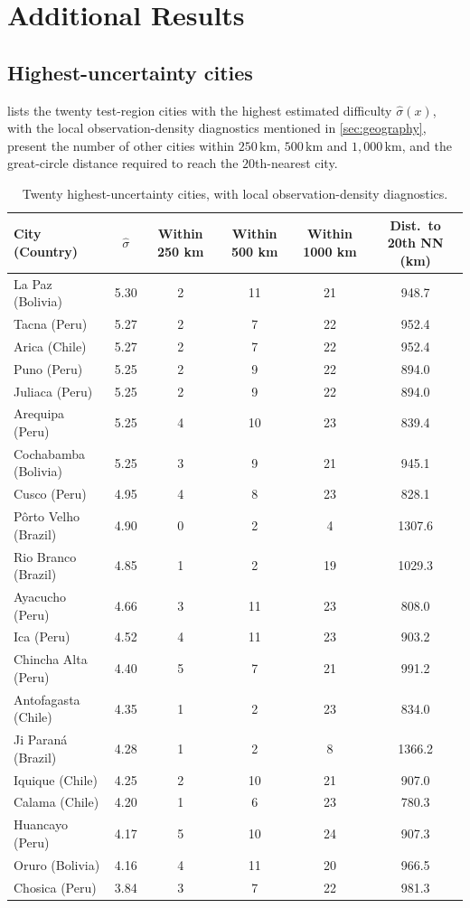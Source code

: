 \chapter{Additional Results}
\label{ch:appendix}

\section{Highest-uncertainty cities}

 lists the twenty test-region cities with the highest estimated difficulty $\hat\sigma(x)$, with the local observation-density diagnostics mentioned in \cref{sec:geography}, present the number of other cities within $250\,\mathrm{km}$, $500\,\mathrm{km}$ and $1{,}000\,\mathrm{km}$, and the great-circle distance required to reach the $20$th-nearest city.
\begin{table}[H]
\centering
\caption{Twenty highest-uncertainty cities, with local observation-density diagnostics.}
\label{tab:appendix-cities}
\scriptsize
\begin{tabular}{lccccc}
\toprule
City (Country) & $\hat\sigma$ & Within 250 km & Within 500 km & Within 1000 km & Dist.\ to 20th NN (km) \\
\midrule
La Paz (Bolivia) & 5.30 & 2 & 11 & 21 & 948.7 \\
Tacna (Peru) & 5.27 & 2 & 7 & 22 & 952.4 \\
Arica (Chile) & 5.27 & 2 & 7 & 22 & 952.4 \\
Puno (Peru) & 5.25 & 2 & 9 & 22 & 894.0 \\
Juliaca (Peru) & 5.25 & 2 & 9 & 22 & 894.0 \\
Arequipa (Peru) & 5.25 & 4 & 10 & 23 & 839.4 \\
Cochabamba (Bolivia) & 5.25 & 3 & 9 & 21 & 945.1 \\
Cusco (Peru) & 4.95 & 4 & 8 & 23 & 828.1 \\
P\^orto Velho (Brazil) & 4.90 & 0 & 2 & 4 & 1307.6 \\
Rio Branco (Brazil) & 4.85 & 1 & 2 & 19 & 1029.3 \\
Ayacucho (Peru) & 4.66 & 3 & 11 & 23 & 808.0 \\
Ica (Peru) & 4.52 & 4 & 11 & 23 & 903.2 \\
Chincha Alta (Peru) & 4.40 & 5 & 7 & 21 & 991.2 \\
Antofagasta (Chile) & 4.35 & 1 & 2 & 23 & 834.0 \\
Ji Paran\'a (Brazil) & 4.28 & 1 & 2 & 8 & 1366.2 \\
Iquique (Chile) & 4.25 & 2 & 10 & 21 & 907.0 \\
Calama (Chile) & 4.20 & 1 & 6 & 23 & 780.3 \\
Huancayo (Peru) & 4.17 & 5 & 10 & 24 & 907.3 \\
Oruro (Bolivia) & 4.16 & 4 & 11 & 20 & 966.5 \\
Chosica (Peru) & 3.84 & 3 & 7 & 22 & 981.3 \\
\bottomrule
\end{tabular}
\end{table}

